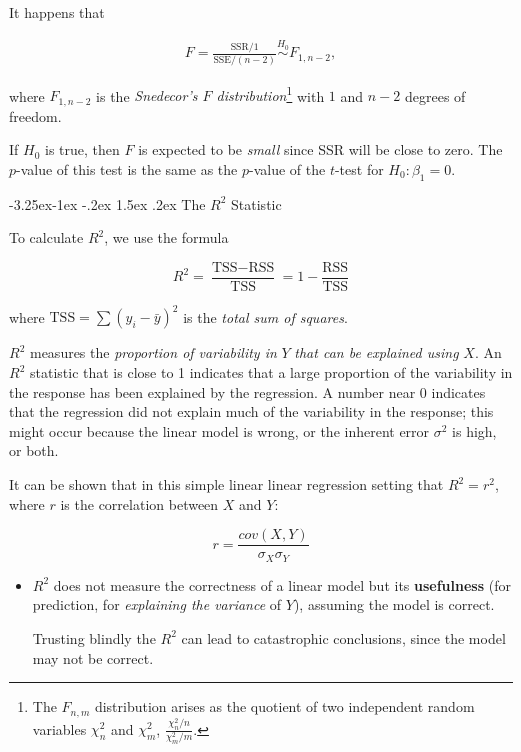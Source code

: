 \documentclass[]{book}
\makeatletter
\let\rmarkdownfootnote\footnote%
\def\footnote{\protect\rmarkdownfootnote}
\newenvironment{rmdblock}[1]
  {\begin{shaded*}
  \begin{itemize}
  \renewcommand{\labelitemi}{
    \raisebox{-.7\height}[0pt][0pt]{
      {\setkeys{Gin}{width=2em,keepaspectratio}\texttt{[image: img/icons/\#1]}}
    }
  }
  \item
  }
  {
  \end{itemize}
  \end{shaded*}
  }
\newenvironment{rmdcaution}
  {\begin{rmdblock}{caution}}
  {\end{rmdblock}}
\renewcommand\subsection{\@startsection{subsection}{2}{\z@}%
                                     {-3.25ex\@plus -1ex \@minus -.2ex}%
                                     {1.5ex \@plus .2ex}%
                                     {\normalfont\large\bfseries\color{Violet}}}
\theoremstyle{definition}
\theoremstyle{definition}
\theoremstyle{definition}
\theoremstyle{remark}
\makeatother
\begin{document}
It happens that

\begin{align*}
F=\frac{\text{SSR}/1}{\text{SSE}/(n-2)}\stackrel{H_0}{\sim} F_{1,n-2},
\end{align*}

where \(F_{1,n-2}\) is the \emph{Snedecor's \(F\)
distribution}\footnote{The \(F_{n,m}\) distribution arises as the
  quotient of two independent random variables \(\chi^2_n\) and
  \(\chi^2_m\), \(\frac{\chi^2_n/n}{\chi^2_m/m}\).} with \(1\) and
\(n-2\) degrees of freedom.

If \(H_0\) is true, then \(F\) is expected to be \emph{small} since SSR
will be close to zero. The \(p\)-value of this test is the same as the
\(p\)-value of the \(t\)-test for \(H_0:\beta_1=0\).

\subsection{\texorpdfstring{The \(R^2\)
Statistic}{The R\^{}2 Statistic}}\label{the-r2-statistic}

To calculate \(R^2\), we use the formula

\[ R^2 = \frac{\text{TSS} - \text{RSS}}{\text{TSS}} = 1- \frac{\text{RSS}}{\text{TSS}} \]

where \(\text{TSS} = \sum (y_i - \bar{y})^2\) is the \emph{total sum of
squares}.

\(R^2\) measures the \emph{proportion of variability in} \(Y\)
\emph{that can be explained using} \(X\). An \(R^2\) statistic that is
close to 1 indicates that a large proportion of the variability in the
response has been explained by the regression. A number near 0 indicates
that the regression did not explain much of the variability in the
response; this might occur because the linear model is wrong, or the
inherent error \(\sigma^2\) is high, or both.

It can be shown that in this simple linear linear regression setting
that \(R^2 = r^2\), where \(r\) is the correlation between \(X\) and
\(Y\):

\[ r = \frac{cov(X,Y)}{\sigma_X \sigma_Y} \]

\begin{rmdcaution}
\(R^2\) does not measure the correctness of a linear model but its
\textbf{usefulness} (for prediction, for \emph{explaining the variance}
of \(Y\)), assuming the model is correct.

Trusting blindly the \(R^2\) can lead to catastrophic conclusions, since
the model may not be correct.
\end{rmdcaution}
\end{document}
